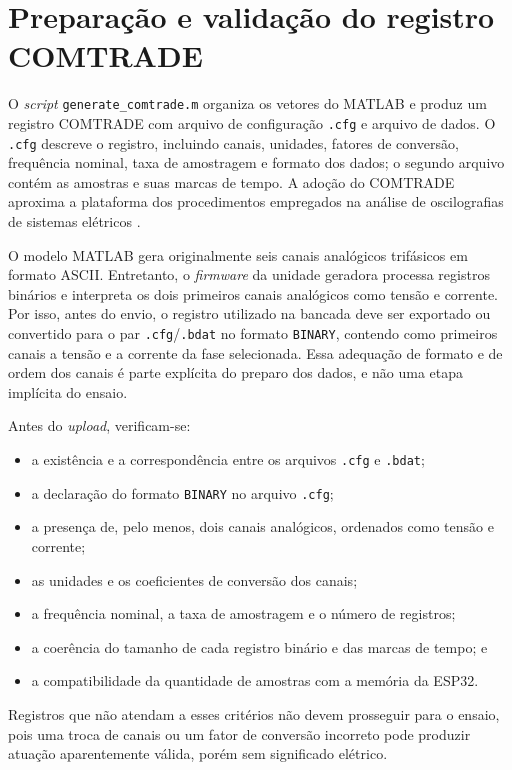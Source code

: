 \section{Preparação e validação do registro COMTRADE}

O \textit{script} \texttt{generate\_comtrade.m} organiza os vetores do MATLAB e produz um registro COMTRADE com arquivo de configuração \texttt{.cfg} e arquivo de dados. O \texttt{.cfg} descreve o registro, incluindo canais, unidades, fatores de conversão, frequência nominal, taxa de amostragem e formato dos dados; o segundo arquivo contém as amostras e suas marcas de tempo. A adoção do COMTRADE aproxima a plataforma dos procedimentos empregados na análise de oscilografias de sistemas elétricos \cite{ieee_comtrade,iec_60255_24_2013}.

O modelo MATLAB gera originalmente seis canais analógicos trifásicos em formato ASCII. Entretanto, o \textit{firmware}  da unidade geradora processa registros binários e interpreta os dois primeiros canais analógicos como tensão e corrente. Por isso, antes do envio, o registro utilizado na bancada deve ser exportado ou convertido para o par \texttt{.cfg}/\texttt{.bdat} no formato \texttt{BINARY}, contendo como primeiros canais a tensão e a corrente da fase selecionada. Essa adequação de formato e de ordem dos canais é parte explícita do preparo dos dados, e não uma etapa implícita do ensaio.

Antes do \textit{upload}, verificam-se:

\begin{itemize}
  \item a existência e a correspondência entre os arquivos \texttt{.cfg} e \texttt{.bdat};
  \item a declaração do formato \texttt{BINARY} no arquivo \texttt{.cfg};
  \item a presença de, pelo menos, dois canais analógicos, ordenados como tensão e corrente;
  \item as unidades e os coeficientes de conversão dos canais;
  \item a frequência nominal, a taxa de amostragem e o número de registros;
  \item a coerência do tamanho de cada registro binário e das marcas de tempo; e
  \item a compatibilidade da quantidade de amostras com a memória da ESP32.
\end{itemize}

Registros que não atendam a esses critérios não devem prosseguir para o ensaio, pois uma troca de canais ou um fator de conversão incorreto pode produzir atuação aparentemente válida, porém sem significado elétrico.

